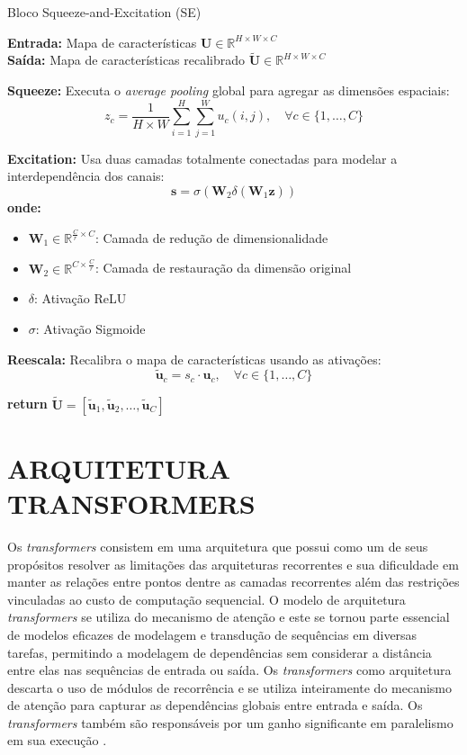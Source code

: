 \begin{algorithm}
\caption{Bloco Squeeze-and-Excitation (SE)}
\label{alg:se_block}
\textbf{Entrada:} Mapa de características $\mathbf{U} \in \mathbb{R}^{H \times W \times C}$\\
\textbf{Saída:} Mapa de características recalibrado $\tilde{\mathbf{U}} \in \mathbb{R}^{H \times W \times C}$
\begin{algorithmic}[1]
\State \textbf{Squeeze:} Executa o \textit{average pooling} global para agregar as dimensões espaciais:
\[
z_c = \frac{1}{H \times W} \sum_{i=1}^H \sum_{j=1}^W u_c(i, j), \quad \forall c \in \{1, \dots, C\}
\]

\State \textbf{Excitation:} Usa duas camadas totalmente conectadas para modelar a interdependência dos canais:
\[
\mathbf{s} = \sigma(\mathbf{W}_2 \delta(\mathbf{W}_1 \mathbf{z}))
\]
\textbf{onde:}
\begin{itemize}
  \item $\mathbf{W}_1 \in \mathbb{R}^{\frac{C}{r} \times C}$: Camada de redução de dimensionalidade
  \item $\mathbf{W}_2 \in \mathbb{R}^{C \times \frac{C}{r}}$: Camada de restauração da dimensão original
  \item $\delta$: Ativação ReLU
  \item $\sigma$: Ativação Sigmoide
\end{itemize}

\State \textbf{Reescala:} Recalibra o mapa de características usando as ativações:
\[
\tilde{\mathbf{u}}_c = s_c \cdot \mathbf{u}_c, \quad \forall c \in \{1, \dots, C\}
\]

\State \textbf{return} $\tilde{\mathbf{U}} = [\tilde{\mathbf{u}}_1, \tilde{\mathbf{u}}_2, \dots, \tilde{\mathbf{u}}_C]$
\end{algorithmic}
\end{algorithm}

\section{ARQUITETURA TRANSFORMERS}
\label{sec:transformers}

Os \textit{transformers} consistem em uma arquitetura que possui como um de seus propósitos resolver as limitações das arquiteturas recorrentes e sua dificuldade em manter as relações entre pontos dentre as camadas recorrentes além das restrições vinculadas ao custo de computação sequencial. O modelo de arquitetura \textit{transformers} se utiliza do mecanismo de atenção e este se tornou parte essencial de modelos eficazes de modelagem e transdução de sequências em diversas tarefas, permitindo a modelagem de dependências sem considerar a distância entre elas nas sequências de entrada ou saída. Os \textit{transformers} como arquitetura descarta o uso de módulos de recorrência e se utiliza inteiramente do mecanismo de atenção para capturar as dependências globais entre entrada e saída. Os \textit{transformers} também são responsáveis por um ganho significante em paralelismo em sua execução \cite{vaswaniAttentionAllYou2023}.

